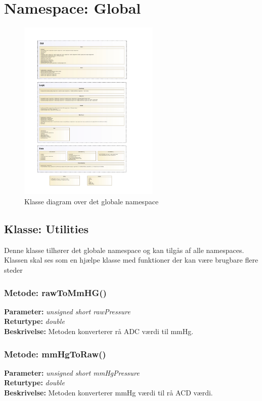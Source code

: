 \section{Namespace: Global}

\begin{figure}[H]
	\centering
	\includegraphics[width=0.6\textwidth]{Implementeringsdokument/klassediagram_extra-crop.pdf}
	\caption{Klasse diagram over det globale namespace}\label{fig:classDiagramextra}
\end{figure}

\subsection{Klasse: Utilities}
Denne klasse tilhører det globale namespace og kan tilgås af alle namespaces. Klassen skal ses som en hjælpe klasse med funktioner der kan være brugbare flere steder

\subsubsection{Metode: rawToMmHG()}
\textbf{Parameter: } \textit{unsigned short rawPressure}
\\ \textbf{Returtype: } \textit{double}
\\ \textbf{Beskrivelse: } Metoden konverterer rå ADC værdi til mmHg.

\subsubsection{Metode: mmHgToRaw()}
\textbf{Parameter: } \textit{unsigned short mmHgPressure}
\\ \textbf{Returtype: } \textit{double}
\\ \textbf{Beskrivelse: } Metoden konverterer mmHg værdi til rå ACD værdi.

